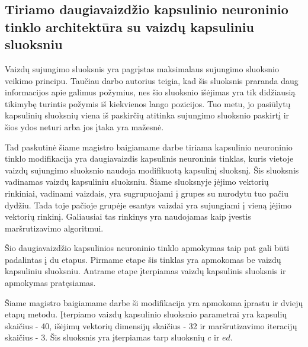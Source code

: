 \subsection{Tiriamo daugiavaizdžio kapsulinio neuroninio tinklo architektūra su vaizdų kapsuliniu sluoksniu}

Vaizdų sujungimo sluoksnis yra pagrįstas maksimalaus sujungimo sluoksnio veikimo principu. Taučiau darbo \cite{capsNet} autorius teigia, kad šis sluoksnis praranda daug informacijos apie galimus požymius, nes šio sluoksnio išėjimas yra tik didžiausią tikimybę turintis požymis iš kiekvienos lango pozicijos. Tuo metu, jo pasiūlytų kapsulinių sluoksnių viena iš paskirčių atitinka sujungimo sluoksnio paskirtį ir šios ydos neturi arba jos įtaka yra mažesnė.

Tad paskutinė šiame magistro baigiamame darbe tiriama kapsulinio neuroninio tinklo modifikacija yra daugiavaizdis kapsulinis neuroninis tinklas, kuris vietoje vaizdų sujungimo sluoksnio naudoja modifikuotą kapsulinį sluoksnį. Šis sluoksnis vadinamas vaizdų kapsuliniu sluoksniu. Šiame sluoksnyje įėjimo vektorių rinkiniai, vadinami vaizdais, yra sugrupuojami į grupes su nurodytu tuo pačiu dydžiu. Tada toje pačioje grupėje esantys vaizdai yra sujungiami į vieną įėjimo vektorių rinkinį. Galiausiai tas rinkinys yra naudojamas kaip įvestis maršrutizavimo algoritmui.

Šio daugiavaizdžio kapsulinios neuroninio tinklo apmokymas taip pat gali būti padalintas į du etapus. Pirmame etape šis tinklas yra apmokomas be vaizdų kapsuliniu sluoksniu. Antrame etape įterpiamas vaizdų kapsulinis sluoksnis ir apmokymas pratęsiamas.

Šiame magistro baigiamame darbe ši modifikacija yra apmokoma įprastu ir dviejų etapų metodu. Įterpiamo vaizdų kapsulinio sluoksnio parametrai yra kapsulių skaičius - 40, išėjimų vektorių dimensijų skaičius - 32 ir maršrutizavimo iteracijų skaičius - 3. Šis sluoksnis yra įterpiamas tarp sluoksnių $c$ ir $ed$.

